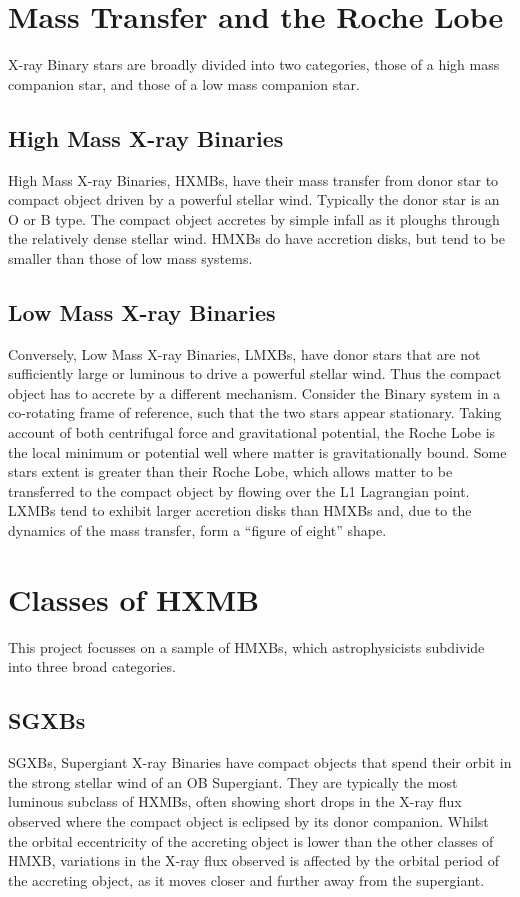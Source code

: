 \section{Mass Transfer and the Roche Lobe}
X-ray Binary stars are broadly divided into two categories, those of a high mass companion star, and those of a low mass companion star.

\subsection{High Mass X-ray Binaries}
High Mass X-ray Binaries, HXMBs, have their mass transfer from donor star to compact object driven by a powerful stellar wind. Typically the donor star is an O or B type. The compact object accretes by simple infall as it ploughs through the relatively dense stellar wind. HMXBs do have accretion disks, but tend to be smaller than those of low mass systems. 

\subsection{Low Mass X-ray Binaries}
Conversely, Low Mass X-ray Binaries, LMXBs, have donor stars that are not sufficiently large or luminous to drive a powerful stellar wind. Thus the compact object has to accrete by a different mechanism. Consider the Binary system in a co-rotating frame of reference, such that the two stars appear stationary. Taking account of both centrifugal force and gravitational potential, the Roche Lobe is the local minimum or potential well where matter is gravitationally bound. Some stars extent is greater than their Roche Lobe, which allows matter to be transferred to the compact object by flowing over the L1 Lagrangian point. LXMBs tend to exhibit larger accretion disks than HMXBs and, due to the dynamics of the mass transfer, form a \textquotedblleft{}figure of eight\textquotedblright{} shape. 

\section{Classes of HXMB}
This project focusses on a sample of HMXBs, which astrophysicists subdivide into three broad categories.

\subsection{SGXBs}
SGXBs, Supergiant X-ray Binaries have compact objects that spend their orbit in the strong stellar wind of an OB Supergiant. They are typically the most luminous subclass of HXMBs, often showing short drops in the X-ray flux observed where the compact object is eclipsed by its donor companion. Whilst the orbital eccentricity of the accreting object is lower than the other classes of HMXB, variations in the X-ray flux observed is affected by the orbital period of the accreting object, as it moves closer and further away from the supergiant.


